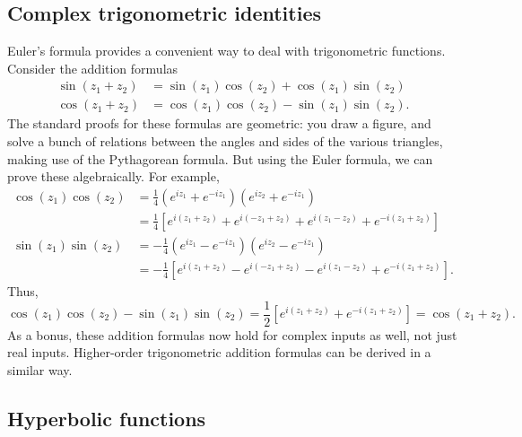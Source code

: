 \documentclass[10pt,a4paper]{article}
\begin{document}
\subsection{Complex trigonometric identities}
\label{complex-trigo}

Euler's formula provides a convenient way to deal with trigonometric
functions. Consider the addition formulas
\begin{align}
  \sin(z_1 + z_2) &= \sin(z_1) \cos(z_2) + \cos(z_1)\sin(z_2) \\
  \cos(z_1 + z_2) &= \cos(z_1) \cos(z_2) - \sin(z_1)\sin(z_2).
\end{align}
The standard proofs for these formulas are geometric: you draw a
figure, and solve a bunch of relations between the angles and sides of
the various triangles, making use of the Pythagorean formula. But
using the Euler formula, we can prove these algebraically.  For
example,
\begin{align}
  \cos(z_1)\cos(z_2) &= \frac{1}{4}\left(e^{iz_1} + e^{-iz_1}\right) \left(e^{iz_2} + e^{-iz_1}\right)\\
  &= \frac{1}{4}\left[e^{i(z_1+z_2)} + e^{i(-z_1 + z_2)} + e^{i(z_1 -z_2)} + e^{-i(z_1+z_2)}\right] \\
  \sin(z_1)\sin(z_2) &= -\frac{1}{4}\left(e^{iz_1} - e^{-iz_1}\right) \left(e^{iz_2} - e^{-iz_1}\right) \\
  &= -\frac{1}{4}\left[e^{i(z_1+z_2)} - e^{i(-z_1 + z_2)} - e^{i(z_1 -z_2)} + e^{-i(z_1+z_2)}\right].
\end{align}
Thus,
\begin{equation}
  \cos(z_1) \cos(z_2) - \sin(z_1)\sin(z_2)
  = \frac{1}{2}\left[e^{i(z_1+z_2)} + e^{-i(z_1+z_2)}\right] = \cos(z_1 + z_2).
\end{equation}
As a bonus, these addition formulas now hold for complex inputs as
well, not just real inputs. Higher-order trigonometric addition
formulas can be derived in a similar way.

\subsection{Hyperbolic functions}\label{hyperbolic-functions}
\end{document}
